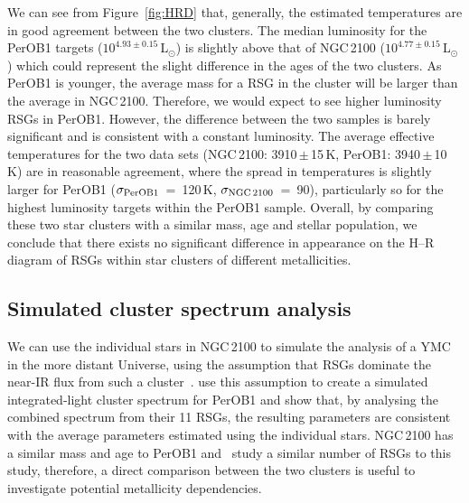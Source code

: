\documentclass[useAMS,usenatbib]{mn2e}
\begin{document}
We can see from Figure~\ref{fig:HRD} that, generally, the estimated temperatures are in good agreement between the two clusters.
The median luminosity for the PerOB1 targets ($10^{4.93\pm0.15}\,$L$_{\odot}$) is slightly above that of NGC\,2100 ($10^{4.77\pm0.15}\,$L$_{\odot}$) which could represent the slight difference in the ages of the two clusters.
As PerOB1 is younger, the average mass for a RSG in the cluster will be larger than the average in NGC\,2100.
Therefore, we would expect to see higher luminosity RSGs in PerOB1.
However, the difference between the two samples is barely significant and is consistent with a constant luminosity.
The average effective temperatures for the two data sets (NGC\,2100: 3910\,$\pm$\,15\,K, PerOB1: 3940\,$\pm$\,10\,K) are in reasonable agreement, where the spread in temperatures is slightly larger for PerOB1
($\sigma_{\rm PerOB1}$~=~120\,K, $\sigma_{\rm NGC\,2100}$~=~90),
particularly so for the highest luminosity targets within the PerOB1 sample.
Overall, by comparing these two star clusters with a similar mass, age and stellar population, we conclude that there exists no significant difference in appearance on the H--R diagram of RSGs within star clusters of different metallicities.


\subsection{Simulated cluster spectrum analysis} %
\label{sub:integrated_light_cluster_analysis}

We can use the individual stars in NGC\,2100 to simulate the analysis of a YMC in the more distant Universe, using the assumption that RSGs dominate the near-IR flux from such a cluster~\citep{2013MNRAS.430L..35G}.
\cite{2014ApJ...788...58G} use this assumption to create a simulated integrated-light cluster spectrum for PerOB1 and show that, by analysing the combined spectrum from their 11 RSGs, the resulting parameters are consistent with the average parameters estimated using the individual stars.
NGC\,2100 has a similar mass and age to PerOB1 and~\cite{2014ApJ...788...58G} study a similar number of RSGs to this study,
therefore, a direct comparison between the two clusters is useful to investigate potential metallicity dependencies.
\end{document}
